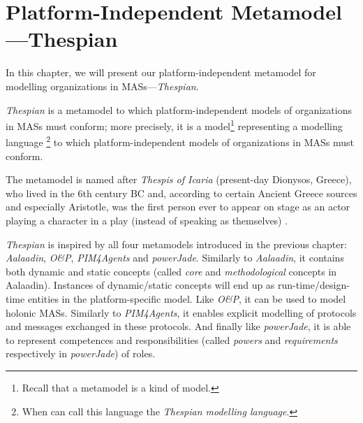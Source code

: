 
\chapter{Platform-Independent Metamodel---Thespian}

In this chapter, we will present our platform-independent metamodel for modelling organizations in MASs---\textit{Thespian}.

\textit{Thespian} is a metamodel to which platform-independent models of organizations in MASs must conform; more precisely, it is a model\footnote{Recall that a metamodel is a kind of model.} representing a modelling language \footnote{When can call this language the \textit{Thespian modelling language}.} to which platform-independent models of organizations in MASs must conform.

The metamodel is named after \textit{Thespis of Icaria} (present-day Dionysos, Greece), who lived in the 6th century BC and, according to certain Ancient Greece sources and especially Aristotle, was the first person ever to appear on stage as an actor playing a character in a play (instead of speaking as themselves) \cite{Wikipedia-Thespis}.

\textit{Thespian} is inspired by all four metamodels introduced in the previous chapter: \textit{Aalaadin}, \textit{O\&P}, \textit{PIM4Agents} and \textit{powerJade}.
Similarly to \textit{Aalaadin}, it contains both dynamic and static concepts (called \textit{core} and \textit{methodological} concepts in Aalaadin).
Instances of dynamic/static concepts will end up as run-time/design-time entities in the platform-specific model.
Like \textit{O\&P}, it can be used to model holonic MASs.
Similarly to \textit{PIM4Agents}, it enables explicit modelling of protocols and messages exchanged in these protocols.
And finally like \textit{powerJade}, it is able to represent competences and responsibilities (called \textit{powers} and \textit{requirements} respectively in \textit{powerJade}) of roles.

